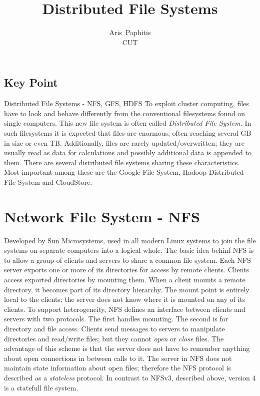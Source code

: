 \documentclass[letterpaper,twocolumn,10pt]{article}
\begin{document}
\date{}

\title{\Large \bf Distributed File Systems}

\author{
{\rm Aris\ Paphitis}\\
CUT
} %

\maketitle

\thispagestyle{empty}


\subsection*{Key Point}
Distributed File Systems - NFS, GFS, HDFS
To exploit cluster computing, files have to look and behave differently from the conventional filesystems found on single computers. This new file system is often called \textit{Distributed File System}. In such filesystems it is expected that files are enormous; often reaching several GB in size or even TB. Additionally, files are rarely updated/overwritten; they are usually read as data for calculations and possibly additional data is appended to them. There are several distributed file systems sharing these characteristics. Most important among these are the Google File System, Hadoop Distributed File System and CloudStore.

\section{Network File System - NFS}
Developed by Sun Microsystems, used in all modern Linux systems to join the file systems on separate computers into a logical whole.
The basic idea behinf NFS is to allow a group of clients and servers to share a common file system.
Each NFS server exports one or more of its directories for access by remote clients. Clients access exported directories by mounting them. When a client mounts a remote directory, it becomes part of its directory hierarchy. The mount point is entirely local to the clients; the server does not know where it is mounted on any of its clients.
To support heterogeneity, NFS defines an interface between clients and servers with two protocols. The first handles mounting. The second is for directory and file access. Clients send messages to servers to manipulate directories and read/write files; but they cannot \textit{open} or \textit{close} files. The advantage of this scheme is that the server does not have to remember anything about open connections in between calls to it. The server in NFS does not maintain state information about open files; therefore the NFS protocol is described as a \textit{stateless} protocol. 
In contrast to NFSv3, described above, version 4 is a statefull file system.
\end{document}
